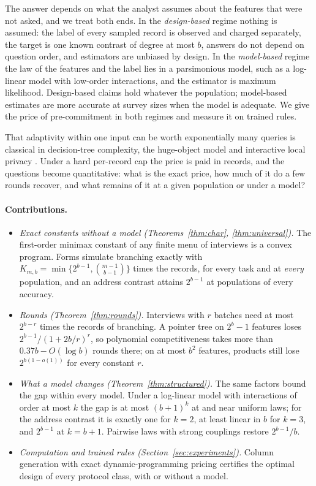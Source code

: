 \documentclass{article}
\begin{document}
The answer depends on what the analyst assumes about the features that were not asked, and we treat both ends. In the \emph{design-based} regime nothing is assumed: the label of every sampled record is observed and charged separately, the target is one known contrast of degree at most $b$, answers do not depend on question order, and estimators are unbiased by design. In the \emph{model-based} regime the law of the features and the label lies in a parsimonious model, such as a log-linear model with low-order interactions, and the estimator is maximum likelihood. Design-based claims hold whatever the population; model-based estimates are more accurate at survey sizes when the model is adequate. We give the price of pre-commitment in both regimes and measure it on trained rules.

That adaptivity within one input can be worth exponentially many queries is classical in decision-tree complexity, the huge-object model and interactive local privacy \citep{goldreich2022,adar2024,joseph2019,joseph2020}. Under a hard per-record cap the price is paid in records, and the questions become quantitative: what is the exact price, how much of it do a few rounds recover, and what remains of it at a given population or under a model?

\paragraph{Contributions.}
\begin{itemize}\itemsep1pt\parskip0pt
\item \emph{Exact constants without a model (Theorems~\ref{thm:char}, \ref{thm:universal}).} The first-order minimax constant of any finite menu of interviews is a convex program. Forms simulate branching exactly with $K_{m,b}=\min\{2^{b-1},\binom{m-1}{b-1}\}$ times the records, for every task and at \emph{every} population, and an address contrast attains $2^{b-1}$ at populations of every accuracy.
\item \emph{Rounds (Theorem~\ref{thm:rounds}).} Interviews with $r$ batches need at most $2^{b-r}$ times the records of branching. A pointer tree on $2^b-1$ features loses $2^{b-1}/(1+2b/r)^r$, so polynomial competitiveness takes more than $0.37b-O(\log b)$ rounds there; on at most $b^2$ features, products still lose $2^{b(1-o(1))}$ for every constant $r$.
\item \emph{What a model changes (Theorem~\ref{thm:structured}).} The same factors bound the gap within every model. Under a log-linear model with interactions of order at most $k$ the gap is at most $(b+1)^k$ at and near uniform laws; for the address contrast it is exactly one for $k=2$, at least linear in $b$ for $k=3$, and $2^{b-1}$ at $k=b+1$. Pairwise laws with strong couplings restore $2^{b-1}/b$.
\item \emph{Computation and trained rules (Section~\ref{sec:experiments}).} Column generation with exact dynamic-programming pricing certifies the optimal design of every protocol class, with or without a model. \nContribData
\end{itemize}
\end{document}
